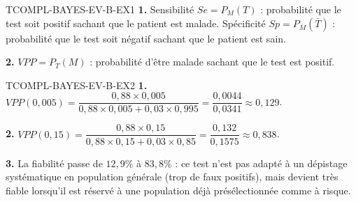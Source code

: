 \begin{corrige}{TCOMPL-BAYES-EV-B-EX1}
\textbf{1.} Sensibilité $Se=P_M(T)$ : probabilité que le test soit positif sachant que le patient est malade. Spécificité $Sp=P_{\bar M}(\bar T)$ : probabilité que le test soit négatif sachant que le patient est sain.

\textbf{2.} $VPP = P_T(M)$ : probabilité d'être malade sachant que le test est positif.
\end{corrige}

\begin{corrige}{TCOMPL-BAYES-EV-B-EX2}
\textbf{1.} $VPP(0{,}005) = \dfrac{0{,}88\times0{,}005}{0{,}88\times0{,}005+0{,}03\times0{,}995} = \dfrac{0{,}0044}{0{,}0341} \approx 0{,}129$.

\textbf{2.} $VPP(0{,}15) = \dfrac{0{,}88\times0{,}15}{0{,}88\times0{,}15+0{,}03\times0{,}85} = \dfrac{0{,}132}{0{,}1575} \approx 0{,}838$.

\textbf{3.} La fiabilité passe de $12{,}9\%$ à $83{,}8\%$ : ce test n'est pas adapté à un dépistage systématique en population générale (trop de faux positifs), mais devient très fiable lorsqu'il est réservé à une population déjà présélectionnée comme à risque.
\end{corrige}
